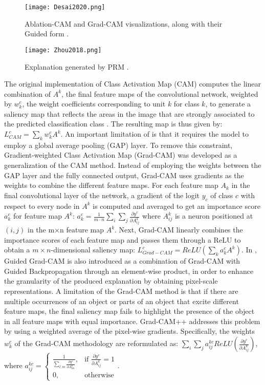 \documentclass[journal]{IEEEtran}
\begin{document}
\begin{figure}
  \texttt{[image: Desai2020.png]}
  \caption{Ablation-CAM and Grad-CAM visualizations, along with their Guided form \cite{Desai2020}.}
\end{figure}

\begin{figure}
  \texttt{[image: Zhou2018.png]}
  \caption{Explanation generated by PRM \cite{Zhou2018}.}
\end{figure}

The original implementation of Class Activation Map (CAM) \cite{Zhou2016} computes the linear combination of $A^k$, the final feature maps of the convolutional network, weighted by $w_k^c$, the weight coefficients corresponding to unit $k$ for class $k$, to generate a saliency map that reflects the areas in the image that are strongly associated to the predicted classification class . The resulting map is thus given by: $L_{CAM}^c=\sum_kw_k^cA^k$. 
An important limitation of \cite{Zhou2016} is that it requires the model to employ a global average pooling (GAP) layer. To remove this constraint, Gradient-weighted Class Activation Map (Grad-CAM) \cite{Selvaraju2016} was developed as a generalization of the CAM method. Instead of employing the weights between the GAP layer and the fully connected output, Grad-CAM uses gradients as the weights to combine the different feature maps. For each feature map $A_k$ in the final convolutional layer of the network, a gradient of the logit $y_c$ of class $c$ with respect to every node in $A^k$ is computed and averaged to get an importance score $a_k^c$ for feature map $A^k$: $a_k^c=\frac{1}{m \cdot n}\sum_i\sum_j\frac{\partial y^c}{\partial A_{ij}^k}$ where $A_{ij}^k$ is a neuron positioned at $(i,j)$ in the m×n feature map $A^k$. Next, Grad-CAM linearly combines the importance scores of each feature map and passes them through a ReLU to obtain a $m\times n$-dimensional saliency map: $L_{Grad-CAM}^c=ReLU\left(\sum_ka_k^cA^k\right)$. 
In \cite{Selvaraju2016}, Guided Grad-CAM is also introduced as a combination of Grad-CAM with Guided Backpropagation through an element-wise product, in order to enhance the granularity of the produced explanation by obtaining pixel-scale representations. 
A limitation of the Grad-CAM method is that if there are multiple occurrences of an object or parts of an object that excite different feature maps, the final saliency map fails to highlight the presence of the object in all feature maps with equal importance. Grad-CAM++ \cite{Chattopadhay2018} addresses this problem by using a weighted average of the pixel-wise gradients. Specifically, the weights $w_k^c$ of the Grad-CAM methodology are reformulated as: $\sum_i\sum_ja_{ij}^{kc}ReLU\left(\frac{\partial y^c}{\partial A_{ij}^k}\right)$, where $a_{ij}^{kc}=\begin{cases} \frac{1}{\sum_{l,m}\frac{\partial y^c}{\partial A^k_{lm}}},& \text{if } \frac{\partial y^c}{\partial A_{ij}^k}=1\\ 0, & \text{otherwise} \end{cases}$. 
\end{document}
